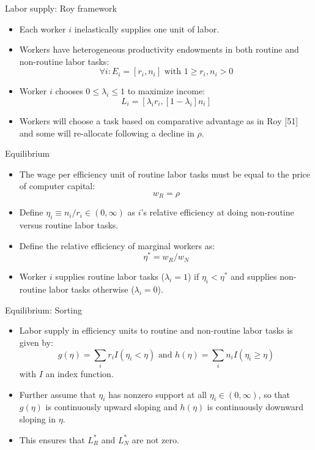 \documentclass[notes=show]{beamer}
\begin{document}
\begin{frame}{Labor supply: Roy framework}
\begin{itemize}
\item Each worker $i$ inelastically supplies one unit of labor. \medskip
\item Workers have heterogeneous productivity endowments in both routine and non-routine labor tasks:
\[
\forall i: E_{i}=[r_{i},n_{i}] \text{ with } 1 \geqslant r_{i}, n_{i} > 0
\]
\item Worker $i$ chooses $ 0 \leqslant \lambda_{i} \leqslant 1 $ to maximize income:
\[
L_{i}=[\lambda_{i}r_{i},[1 - \lambda_{i}]n_{i}]
\]
\item Workers will choose a task based on comparative advantage as in Roy [51] and some will re-allocate following a decline in $ \rho $.
\end{itemize}
\end{frame}

\begin{frame}{Equilibrium}
\begin{itemize}
\item The wage per efficiency unit of routine labor tasks must be equal to the price of computer capital:
\[
w_{R} = \rho  \tag{2}  \label{eq2}
\]
\item Define $ \eta_{i} \equiv n_{i}/r_{i} \in (0, \infty)$ as $i$'s relative efficiency at doing non-routine versus routine labor tasks. \medskip
\item Define the relative efficiency of marginal workers as:
\[
\eta^{*} = w_{R}/w_{N}  \tag{3}  \label{eq3}
\]
\item Worker $i$ supplies routine labor tasks ($ \lambda_{i}=1 $) if $ \eta_{i} < \eta^{*} $ and supplies non-routine labor tasks otherwise ($ \lambda_{i}=0 $).
\end{itemize}
\end{frame}

\begin{frame}{Equilibrium: Sorting}
\begin{itemize}
\item Labor supply in efficiency units to routine and non-routine labor tasks is given by:
\[
g( \eta ) = \sum_{i} r_{i} I( \eta_{i}  < \eta ) \text{ and } h( \eta ) = \sum_{i} n_{i} I (\eta_{i} \geqslant \eta) 
\]
with $I$ an index function. \medskip
\item Further assume that $ \eta_{i} $ has nonzero support at all $ \eta_{i} \in (0, \infty )$, so that $g( \eta )$ is continuously upward sloping and $h( \eta )$ is continuously downward sloping in $\eta$. \medskip
\item This ensures that $L_{R}^{*}$ and $L_{N}^{*}$ are not zero.
\end{itemize}
\end{frame}
\end{document}
